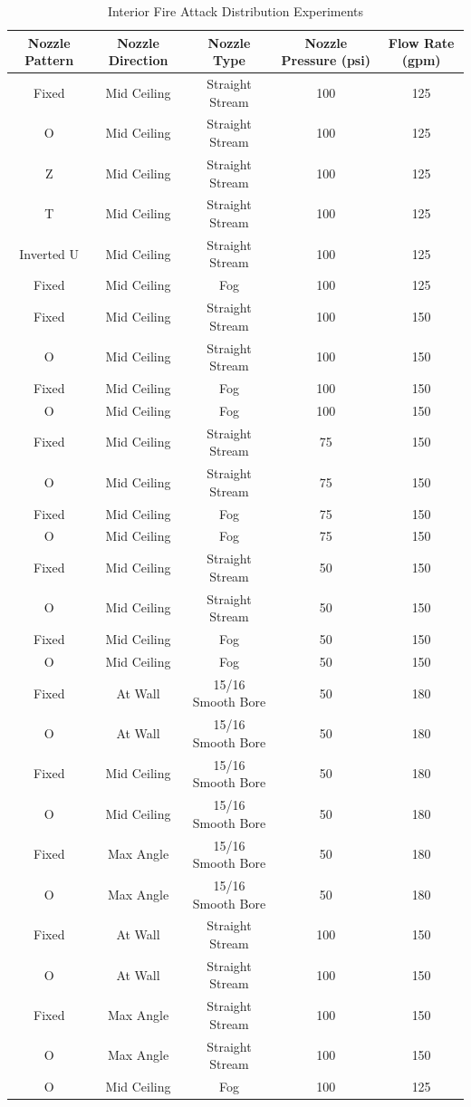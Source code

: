 \documentclass{article}
\begin{document}
\begin{table}[]
\centering
\small
\caption{Interior Fire Attack Distribution Experiments}
\label{Interior_Fire_Attack_Distribution_Experiments}
\begin{tabular}{ccccc}
\toprule[1.5pt]
{\textbf{Nozzle Pattern}} & {\textbf{Nozzle Direction}} & {\textbf{Nozzle Type}} & {\textbf{Nozzle Pressure (psi)}} & \textbf{Flow Rate (gpm)} \\ 
\midrule
Fixed & Mid Ceiling & Straight Stream & 100 & 125 \\
O & Mid Ceiling & Straight Stream & 100 & 125 \\
Z & Mid Ceiling & Straight Stream & 100 & 125 \\
T & Mid Ceiling & Straight Stream & 100 & 125 \\
Inverted U & Mid Ceiling & Straight Stream & 100 & 125 \\
Fixed & Mid Ceiling & Fog & 100 & 125 \\
Fixed & Mid Ceiling & Straight Stream & 100 & 150 \\
O & Mid Ceiling & Straight Stream & 100 & 150 \\
Fixed & Mid Ceiling & Fog & 100 & 150 \\
O & Mid Ceiling & Fog & 100 & 150 \\
Fixed & Mid Ceiling & Straight Stream & 75 & 150 \\
O & Mid Ceiling & Straight Stream & 75 & 150 \\
Fixed & Mid Ceiling & Fog & 75 & 150 \\
O & Mid Ceiling & Fog & 75 & 150 \\
Fixed & Mid Ceiling & Straight Stream & 50 & 150 \\
O & Mid Ceiling & Straight Stream & 50 & 150 \\
Fixed & Mid Ceiling & Fog & 50 & 150 \\
O & Mid Ceiling & Fog & 50 & 150 \\
Fixed & At Wall & 15/16 Smooth Bore & 50 & 180 \\
O & At Wall & 15/16 Smooth Bore & 50 & 180 \\
Fixed & Mid Ceiling & 15/16 Smooth Bore & 50 & 180 \\
O & Mid Ceiling & 15/16 Smooth Bore & 50 & 180 \\
Fixed & Max Angle & 15/16 Smooth Bore & 50 & 180 \\
O & Max Angle & 15/16 Smooth Bore & 50 & 180 \\
Fixed & At Wall & Straight Stream & 100 & 150 \\
O & At Wall & Straight Stream & 100 & 150 \\
Fixed & Max Angle & Straight Stream & 100 & 150 \\
O & Max Angle & Straight Stream & 100 & 150 \\
O & Mid Ceiling & Fog & 100 & 125 \\  
\bottomrule[1.25pt]
\end{tabular}
\end{table}
\end{document}
